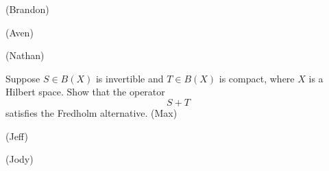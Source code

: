 \documentclass[minion]{homework}
\begin{document}
\begin{aproblems}


 (Brandon)

 (Aven)

 (Nathan)

\hproblem Suppose $S\in B(X)$ is invertible and $T\in B(X)$ is compact,
where $X$ is a Hilbert space.  Show that the operator
\[
S+T
\]
satisfies the Fredholm alternative. (Max)

 (Jeff)

 (Jody)
\end{aproblems}
\end{document}
